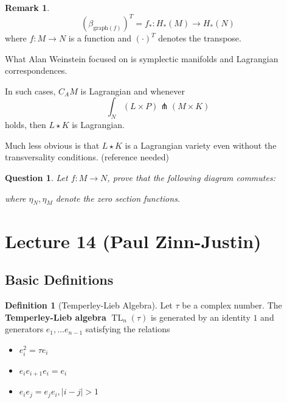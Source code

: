 \documentclass[12pt]{amsart}
\numberwithin{equation}{section}
\newtheorem{Question}{Question}
\theoremstyle{definition}
\newtheorem{Remark}[equation]{Remark}
\newtheorem{Definition}[equation]{Definition}
\numberwithin{figure}{section}
\newcommand{\on}[1]{\operatorname{#1}}
\newcommand{\TeL}{\on{TL}}
\begin{document}
\begin{Remark}
	\[
		(\beta_{\text{graph}(f)})^T = f_* : H_*(M) \to H_*(N)
	\]
	where $f:M \to N$ is a function and $(\cdot)^T$ denotes the transpose.
\end{Remark}

What Alan Weinstein focused on is {\color{red} symplectic} manifolds and {\color{red} Lagrangian} correspondences.

In such cases, $C_A M$ is Lagrangian and whenever \[
	\int_N (L\times P) \pitchfork (M\times K)
\] holds, then $L \star K$ is Lagrangian.

Much less obvious is that $L \star K$ is a Lagrangian variety even without the transversality conditions. (reference needed)

\begin{Question}
	Let $f : M \to N$, prove that the following diagram commutes:

	\begin{center}
	\end{center}
	where $\eta_N,\eta_M$ denote the zero section functions.
\end{Question}

\section{Lecture 14 (Paul Zinn-Justin)}

\subsection{Basic Definitions}

\begin{Definition}[Temperley-Lieb Algebra]
	Let $\tau$ be a complex number. The \textbf{Temperley-Lieb algebra} $\TeL_n(\tau)$ is generated by an identity $1$ and generators $e_1, \ldots e_{n-1}$ satisfying the relations
	\begin{itemize}
		\item $e_i^2 = \tau e_i$
		\item $e_i e_{i+1} e_i = e_i$
		\item $e_i e_j = e_j e_i, |i-j|>1$
	\end{itemize}
\end{Definition}
\end{document}

